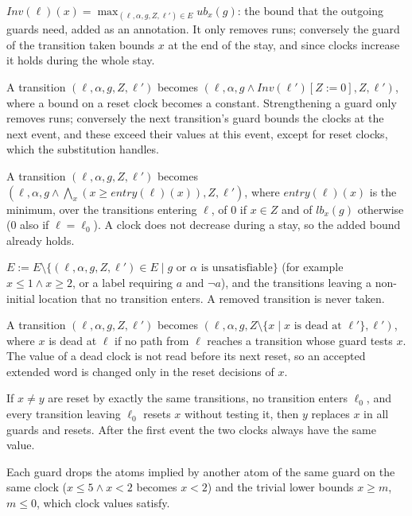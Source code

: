 \documentclass[preprint,12pt]{elsarticle}
\begin{document}
\begin{description}[leftmargin=0pt,labelindent=0pt,itemsep=0pt]
\item[Invariant synthesis.] $\mathit{Inv}(\ell)(x)=\max_{(\ell,\alpha,g,Z,\ell')\in E}\mathit{ub}_x(g)$: the bound that the outgoing guards need, added as an annotation. It only removes runs; conversely the guard of the transition taken bounds $x$ at the end of the stay, and since clocks increase it holds during the whole stay.
\item[Backward propagation.] A transition $(\ell,\alpha,g,Z,\ell')$ becomes $(\ell,\alpha,g\wedge\mathit{Inv}(\ell')[Z:=0],Z,\ell')$, where a bound on a reset clock becomes a constant. Strengthening a guard only removes runs; conversely the next transition's guard bounds the clocks at the next event, and these exceed their values at this event, except for reset clocks, which the substitution handles.
\item[Forward propagation.] A transition $(\ell,\alpha,g,Z,\ell')$ becomes $(\ell,\alpha,g\wedge\bigwedge_x(x\ge\mathit{entry}(\ell)(x)),Z,\ell')$, where $\mathit{entry}(\ell)(x)$ is the minimum, over the transitions entering $\ell$, of $0$ if $x\in Z$ and of $\mathit{lb}_x(g)$ otherwise ($0$ also if $\ell=\ell_0$). A clock does not decrease during a stay, so the added bound already holds.
\item[Removal of transitions.] $E:=E\setminus\{(\ell,\alpha,g,Z,\ell')\in E\mid g\text{ or }\alpha\text{ is unsatisfiable}\}$ (for example $x\le1\wedge x\ge2$, or a label requiring $a$ and $\neg a$), and the transitions leaving a non-initial location that no transition enters. A removed transition is never taken.
\item[Dead resets.] A transition $(\ell,\alpha,g,Z,\ell')$ becomes $(\ell,\alpha,g,Z\setminus\{x\mid x\text{ is dead at }\ell'\},\ell')$, where $x$ is dead at $\ell$ if no path from $\ell$ reaches a transition whose guard tests $x$. The value of a dead clock is not read before its next reset, so an accepted extended word is changed only in the reset decisions of $x$.
\item[Merging of clocks.] If $x\neq y$ are reset by exactly the same transitions, no transition enters $\ell_0$, and every transition leaving $\ell_0$ resets $x$ without testing it, then $y$ replaces $x$ in all guards and resets. After the first event the two clocks always have the same value.
\item[Normalization.] Each guard drops the atoms implied by another atom of the same guard on the same clock ($x\le5\wedge x<2$ becomes $x<2$) and the trivial lower bounds $x\ge m$, $m\le0$, which clock values satisfy.

\end{description}
\end{document}
